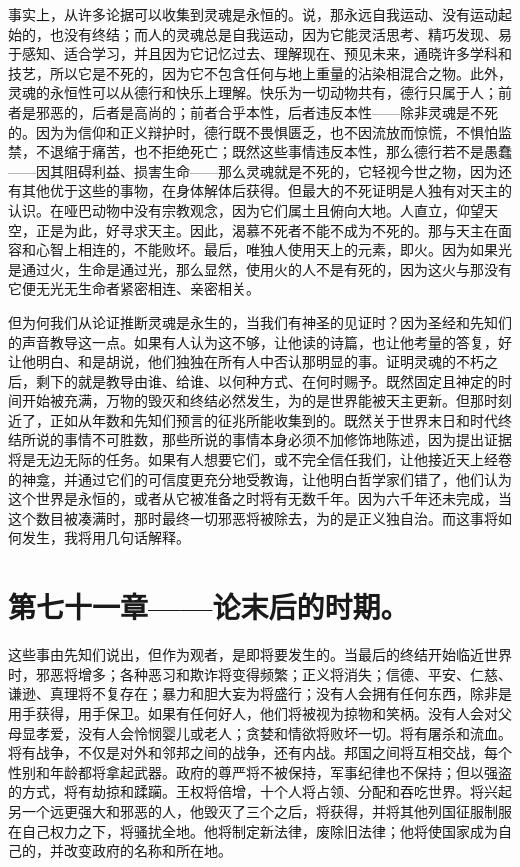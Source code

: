 事实上，从许多论据可以收集到灵魂是永恒的。说，那永远自我运动、没有运动起始的，也没有终结；而人的灵魂总是自我运动，因为它能灵活思考、精巧发现、易于感知、适合学习，并且因为它记忆过去、理解现在、预见未来，通晓许多学科和技艺，所以它是不死的，因为它不包含任何与地上重量的沾染相混合之物。此外，灵魂的永恒性可以从德行和快乐上理解。快乐为一切动物共有，德行只属于人；前者是邪恶的，后者是高尚的；前者合乎本性，后者违反本性——除非灵魂是不死的。因为为信仰和正义辩护时，德行既不畏惧匮乏，也不因流放而惊慌，不惧怕监禁，不退缩于痛苦，也不拒绝死亡；既然这些事情违反本性，那么德行若不是愚蠢——因其阻碍利益、损害生命——那么灵魂就是不死的，它轻视今世之物，因为还有其他优于这些的事物，在身体解体后获得。但最大的不死证明是人独有对天主的认识。在哑巴动物中没有宗教观念，因为它们属土且俯向大地。人直立，仰望天空，正是为此，好寻求天主。因此，渴慕不死者不能不成为不死的。那与天主在面容和心智上相连的，不能败坏。最后，唯独人使用天上的元素，即火。因为如果光是通过火，生命是通过光，那么显然，使用火的人不是有死的，因为这火与那没有它便无光无生命者紧密相连、亲密相关。\par

但为何我们从论证推断灵魂是永生的，当我们有神圣的见证时？因为圣经和先知们的声音教导这一点。如果有人认为这不够，让他读的诗篇，也让他考量的答复，好让他明白、和是胡说，他们独独在所有人中否认那明显的事。证明灵魂的不朽之后，剩下的就是教导由谁、给谁、以何种方式、在何时赐予。既然固定且神定的时间开始被充满，万物的毁灭和终结必然发生，为的是世界能被天主更新。但那时刻近了，正如从年数和先知们预言的征兆所能收集到的。既然关于世界末日和时代终结所说的事情不可胜数，那些所说的事情本身必须不加修饰地陈述，因为提出证据将是无边无际的任务。如果有人想要它们，或不完全信任我们，让他接近天上经卷的神龛，并通过它们的可信度更充分地受教诲，让他明白哲学家们错了，他们认为这个世界是永恒的，或者从它被准备之时将有无数千年。因为六千年还未完成，当这个数目被凑满时，那时最终一切邪恶将被除去，为的是正义独自治。而这事将如何发生，我将用几句话解释。\par


\section{第七十一章——论末后的时期。}

这些事由先知们说出，但作为观者，是即将要发生的。当最后的终结开始临近世界时，邪恶将增多；各种恶习和欺诈将变得频繁；正义将消失；信德、平安、仁慈、谦逊、真理将不复存在；暴力和胆大妄为将盛行；没有人会拥有任何东西，除非是用手获得，用手保卫。如果有任何好人，他们将被视为掠物和笑柄。没有人会对父母显孝爱，没有人会怜悯婴儿或老人；贪婪和情欲将败坏一切。将有屠杀和流血。将有战争，不仅是对外和邻邦之间的战争，还有内战。邦国之间将互相交战，每个性别和年龄都将拿起武器。政府的尊严将不被保持，军事纪律也不保持；但以强盗的方式，将有劫掠和蹂躏。王权将倍增，十个人将占领、分配和吞吃世界。将兴起另一个远更强大和邪恶的人，他毁灭了三个之后，将获得，并将其他列国征服制服在自己权力之下，将骚扰全地。他将制定新法律，废除旧法律；他将使国家成为自己的，并改变政府的名称和所在地。\par

